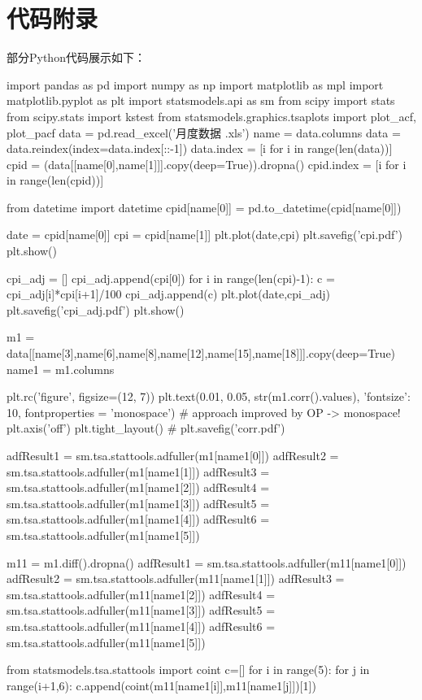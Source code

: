 \documentclass[a4paper,AutoFakeBold,AutoFakeSlant]{ctexart}
\begin{document}
\section*{代码附录}
部分Python代码展示如下：
\begin{python}
import pandas as pd
import numpy as np
import matplotlib as mpl
import matplotlib.pyplot as plt
import statsmodels.api as sm
from scipy import stats
from scipy.stats import kstest
from statsmodels.graphics.tsaplots import plot_acf, plot_pacf
data = pd.read_excel('月度数据 .xls')
name = data.columns
data = data.reindex(index=data.index[::-1])
data.index = [i for i in range(len(data))]
cpid = (data[[name[0],name[1]]].copy(deep=True)).dropna()
cpid.index = [i for i in range(len(cpid))]

from datetime import datetime
cpid[name[0]] = pd.to_datetime(cpid[name[0]])

date = cpid[name[0]]
cpi = cpid[name[1]]
plt.plot(date,cpi)
plt.savefig('cpi.pdf')
plt.show()

cpi_adj = []
cpi_adj.append(cpi[0])
for i in range(len(cpi)-1):
    c = cpi_adj[i]*cpi[i+1]/100
    cpi_adj.append(c)
plt.plot(date,cpi_adj)
plt.savefig('cpi_adj.pdf')
plt.show() 

m1 = data[[name[3],name[6],name[8],name[12],name[15],name[18]]].copy(deep=True)
name1 = m1.columns

plt.rc('figure', figsize=(12, 7))
plt.text(0.01, 0.05, str(m1.corr().values), {'fontsize': 10}, fontproperties = 'monospace') # approach improved by OP -> monospace!
plt.axis('off')
plt.tight_layout()
# plt.savefig('corr.pdf')

adfResult1 = sm.tsa.stattools.adfuller(m1[name1[0]])
adfResult2 = sm.tsa.stattools.adfuller(m1[name1[1]])
adfResult3 = sm.tsa.stattools.adfuller(m1[name1[2]])
adfResult4 = sm.tsa.stattools.adfuller(m1[name1[3]])
adfResult5 = sm.tsa.stattools.adfuller(m1[name1[4]])
adfResult6 = sm.tsa.stattools.adfuller(m1[name1[5]])

m11 = m1.diff().dropna()
adfResult1 = sm.tsa.stattools.adfuller(m11[name1[0]])
adfResult2 = sm.tsa.stattools.adfuller(m11[name1[1]])
adfResult3 = sm.tsa.stattools.adfuller(m11[name1[2]])
adfResult4 = sm.tsa.stattools.adfuller(m11[name1[3]])
adfResult5 = sm.tsa.stattools.adfuller(m11[name1[4]])
adfResult6 = sm.tsa.stattools.adfuller(m11[name1[5]])

from statsmodels.tsa.stattools import coint
c=[]
for i in range(5):
    for j in range(i+1,6):
        c.append(coint(m11[name1[i]],m11[name1[j]])[1])


\end{python}
\end{document}
